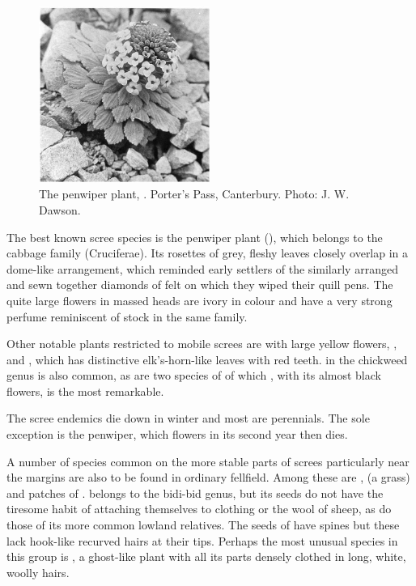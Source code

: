 \begin{figure}
	\includegraphics[width=0.5\textwidth]{graphics/figure112penwiper.jpg}
	\centering
	\caption[The penwiper plant]{The penwiper plant, .
Porter's Pass, Canterbury.
	Photo: J. W. Dawson.}%
	\label{fig:112penwiper}
\end{figure}

The best known scree species is the penwiper plant (), which belongs to the cabbage family (Cruciferae).
Its rosettes of grey, fleshy leaves closely overlap in a dome-like arrangement, which reminded early settlers of the similarly arranged and sewn together diamonds of felt on which they wiped their quill pens.
The quite large flowers in massed heads are ivory in colour and have a very strong perfume reminiscent of stock in the same family.

Other notable plants restricted to mobile screes are  with large yellow flowers, , and , which has distinctive elk's-horn-like leaves with red teeth.  in the chickweed genus is also common, as are two species of  of which , with its almost black flowers, is the most remarkable.

The scree endemics die down in winter and most are perennials.
The sole exception is the penwiper, which flowers in its second year then dies.

A number of species common on the more stable parts of screes particularly near the margins are also to be found in ordinary fellfield.
Among these are ,  (a grass) and patches of .  belongs to the bidi-bid genus, but its seeds do not have the tiresome habit of attaching themselves to clothing or the wool of sheep, as do those of its more common lowland relatives.
The seeds of  have spines but these lack hook-like recurved hairs at their tips.
Perhaps the most unusual species in this group is , a ghost-like plant with all its parts densely clothed in long, white, woolly hairs.

